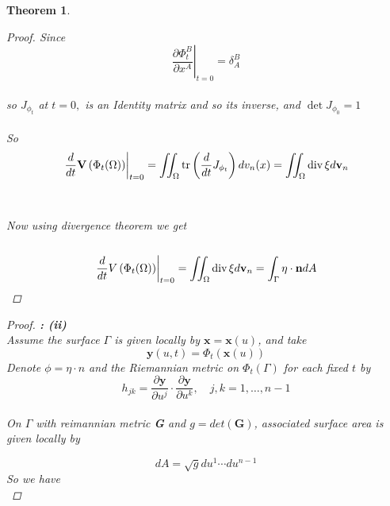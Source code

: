 \documentclass[oneside]{book}
\newtheorem{theorem}{Theorem}[section]
\begin{document}
\begin{theorem}
\begin{proof}
 Since \\
  $$\left.\frac{\partial \Phi_{t}^{B}}{\partial x^{A}}\right|_{t=0}=\delta_{A}^{B} $$
  \\
   so  $J_{\phi_{t}} $ at $t = 0,$ is an Identity matrix and so its inverse, and  $\operatorname{det} J_{\phi_{0}} = 1$\\\\
 So \\
 \begin{equation}
  \left.\frac{d}{d t} \mathbf{V}\left(\Phi_{t}(\Omega)\right)\right|_{t=0} = \iint_{\Omega}\operatorname{tr}\left(\frac{d}{d t} J_{\phi_{t}}\right) d v_{n}(x) = \iint_{\Omega} \operatorname{div} \xi d \mathbf{v}_{n} \\\\
  \end{equation} \\\\
  Now using divergence theorem we get \\\\
 \begin{equation}
  \left.\frac{d}{d t} V\left(\Phi_{t}(\Omega)\right)\right|_{t=0}=\iint_{\Omega} \operatorname{div} \xi d \mathbf{v}_{n}=\int_{\Gamma} \eta \cdot \mathbf{n} d A \\\\
 \end{equation}

 
 
 \end{proof}
 \begin{proof}
 
 
 \textbf{: (ii)} 
 \\
 Assume the surface $\Gamma$ is given locally by $\mathbf{x}=\mathbf{x}(u)$, and take \\
$$
\mathbf{y}(u, t)=\Phi_{t}(\mathbf{x}(u))
$$
Denote $\phi = \eta\cdot{n}$ and the Riemannian metric on $\Phi_{t}(\Gamma)$ for each fixed $t$ by 
\begin{equation}
h_{j k}=\frac{\partial \mathbf{y}}{\partial u^{j}} \cdot \frac{\partial \mathbf{y}}{\partial u^{k}}, \quad j, k=1, \ldots, n-1
\end{equation} \\
On $\Gamma$ with reimannian metric \textbf{G} and  $g=det(\textbf{G})$, associated surface area is given locally by 

\begin{equation}
    d A=\sqrt{g} d u^{1} \cdots d u^{n-1}
\end{equation} 
So we have \\


\end{proof}
\end{theorem}
\end{document}
